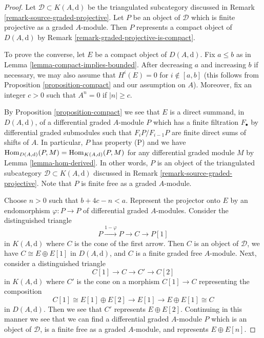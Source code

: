 \begin{proof}
Let $\mathcal{D} \subset K(A, \text{d})$ be the triangulated subcategory
discussed in Remark \ref{remark-source-graded-projective}.
Let $P$ be an object of $\mathcal{D}$ which is finite projective
as a graded $A$-module. Then $P$ represents a compact object of
$D(A, \text{d})$ by Remark \ref{remark-graded-projective-is-compact}.

\medskip\noindent
To prove the converse, let $E$ be a compact object of $D(A, \text{d})$.
Fix $a \leq b$ as in Lemma \ref{lemma-compact-implies-bounded}.
After decreasing $a$ and increasing $b$ if necessary, we may also
assume that $H^i(E) = 0$ for $i \not \in [a, b]$ (this follows
from Proposition \ref{proposition-compact} and our assumption on $A$).
Moreover, fix an integer $c > 0$ such that $A^n = 0$ if $|n| \geq c$.

\medskip\noindent
By Proposition \ref{proposition-compact} we see that $E$ is a direct
summand, in $D(A, \text{d})$, of a differential graded $A$-module $P$
which has a finite filtration $F_\bullet$ by differential
graded submodules such that $F_iP/F_{i - 1}P$ are finite direct sums
of shifts of $A$. In particular, $P$ has property (P) and we have
$\mathop{\mathrm{Hom}}\nolimits_{D(A, \text{d})}(P, M) = \mathop{\mathrm{Hom}}\nolimits_{K(A, \text{d})}(P, M)$ for any
differential graded module $M$ by Lemma \ref{lemma-hom-derived}.
In other words, $P$ is an object of the triangulated
subcategory $\mathcal{D} \subset K(A, \text{d})$ discussed in
Remark \ref{remark-source-graded-projective}.
Note that $P$ is finite free as a graded $A$-module.

\medskip\noindent
Choose $n > 0$ such that $b + 4c - n < a$.
Represent the projector onto $E$ by an endomorphism $\varphi : P \to P$ of
differential graded $A$-modules. Consider the distinguished triangle
$$
P \xrightarrow{1 - \varphi} P \to C \to P[1]
$$
in $K(A, \text{d})$ where $C$ is the cone of the first arrow. Then
$C$ is an object of $\mathcal{D}$,
we have $C \cong E \oplus E[1]$ in $D(A, \text{d})$, and
$C$ is a finite graded free $A$-module.
Next, consider a distinguished triangle
$$
C[1] \to C \to C' \to C[2]
$$
in $K(A, \text{d})$ where $C'$ is the cone on a morphism $C[1] \to C$
representing the composition
$$
C[1] \cong E[1] \oplus E[2] \to E[1] \to E \oplus E[1] \cong C
$$
in $D(A, \text{d})$. Then we see that $C'$ represents $E \oplus E[2]$.
Continuing in this manner we see that we can find a differential
graded $A$-module $P$ which is an object of $\mathcal{D}$,
is a finite free as a graded $A$-module, and represents $E \oplus E[n]$.


\end{proof}
